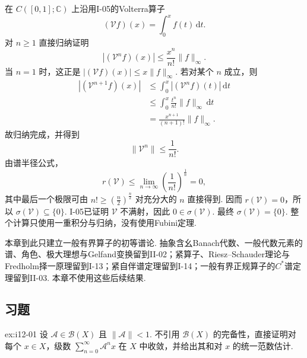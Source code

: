 \begin{FAExample}[谱为零点单集]\label{i12:volterra-spectrum}
在 \(\displaystyle C([0,1];\mathbb C)\) 上沿用I-05的Volterra算子
\[
(\mathcal V f)(x)
=
\int_0^x f(t)\,\mathrm{d}t.
\]
对 \(\displaystyle n\geqslant1\) 直接归纳证明
\[
|(\mathcal V^n f)(x)|
\leqslant
\frac{x^n}{n!}\|f\|_\infty.
\]
当 \(\displaystyle n=1\) 时，这正是
\(\displaystyle |(\mathcal V f)(x)| \leqslant x\|f\|_\infty\).
若对某个 \(\displaystyle n\) 成立，则
\[
\begin{aligned}
\displaystyle |(\mathcal V^{n+1}f)(x)|
&\displaystyle \leqslant
\int_0^x
|(\mathcal V^nf)(t)|\,\mathrm{d}t\\[6pt]
&\displaystyle \leqslant
\int_0^x
\frac{t^n}{n!}\|f\|_\infty\,\mathrm{d}t\\[12pt]
&\displaystyle =
\frac{x^{n+1}}{(n+1)!}\|f\|_\infty.
\end{aligned}
\]
故归纳完成，并得到
\[
\|\mathcal V^n\|
\leqslant
\frac{1}{n!}.
\]
由谱半径公式，
\[
r(\mathcal V)
\leqslant
\lim_{n\to\infty}(\frac{1}{n!})^{\frac{1}{n}}
=0,
\]
其中最后一个极限可由 \(\displaystyle n!\geqslant(\frac{n}{2})^{\frac{n}{2}}\) 对充分大的 \(\displaystyle n\) 直接得到. 因而 \(\displaystyle r(\mathcal V)=0\)，所以 \(\displaystyle \sigma(\mathcal V)\subseteq\{0\}\). I-05已证明 \(\displaystyle \mathcal V\) 不满射，因此 \(\displaystyle 0\in\sigma(\mathcal V)\). 最终
\(\displaystyle \sigma(\mathcal V) = \{0\}\).
整个计算只使用一重积分与归纳，没有使用Fubini定理.
\end{FAExample}

\begin{FARemark}[后续理论边界]
本章到此只建立一般有界算子的初等谱论. 抽象含幺Banach代数、一般代数元素的谱、角色、极大理想与Gelfand变换留到II-02；紧算子、Riesz--Schauder理论与Fredholm择一原理留到I-13；紧自伴谱定理留到I-14；一般有界正规算子的\(\displaystyle C^*\)谱定理留到II-03. 本章不使用这些后续结果.
\end{FARemark}

\subsection{习题}\label{subsec:i12-exercises}

\begin{FAExercise}[逐向量Neumann收敛]{ex:i12-01}
设 \(\displaystyle \mathcal A\in\mathcal B(X)\) 且 \(\displaystyle \|\mathcal A\|<1\). 不引用 \(\displaystyle \mathcal B(X)\) 的完备性，直接证明对每个 \(\displaystyle x\in X\)，级数 \(\displaystyle \sum_{n=0}^{\infty}\mathcal A^n x\) 在 \(\displaystyle X\) 中收敛，并给出其和对 \(\displaystyle x\) 的统一范数估计.
\end{FAExercise}

